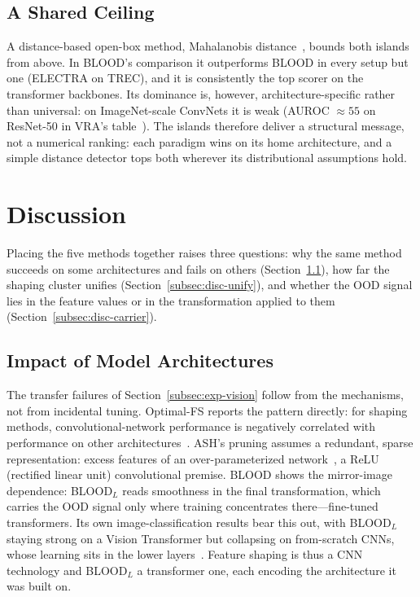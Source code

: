 \documentclass[a4paper]{article}
\begin{document}
\subsection{A Shared Ceiling}
\label{subsec:exp-ceiling}

A distance-based open-box method, Mahalanobis distance~\citep{mahalanobis}, bounds both
islands from above. In BLOOD's comparison it outperforms BLOOD in every setup but one
(ELECTRA on TREC), and it is consistently the top scorer on the transformer
backbones. Its dominance is, however, architecture-specific rather than universal: on
ImageNet-scale ConvNets it is weak (AUROC $\approx 55$ on ResNet-50 in VRA's
table~\citep{vra}). The islands therefore deliver a structural message, not a numerical ranking:
each paradigm wins on its home architecture, and a simple distance detector tops both
wherever its distributional assumptions hold.

\section{Discussion}
\label{sec:discussion}

Placing the five methods together raises three questions: why the same method succeeds
on some architectures and fails on others (Section~\ref{subsec:disc-arch}), how far the
shaping cluster unifies (Section~\ref{subsec:disc-unify}), and whether the OOD signal
lies in the feature values or in the transformation applied to them
(Section~\ref{subsec:disc-carrier}).

\subsection{Impact of Model Architectures}
\label{subsec:disc-arch}

The transfer failures of Section~\ref{subsec:exp-vision} follow from the mechanisms,
not from incidental tuning. Optimal-FS reports the pattern directly: for shaping
methods, convolutional-network performance is negatively correlated with performance on
other architectures~\citep{optimalfs}. ASH's pruning assumes a redundant, sparse
representation: excess features of an over-parameterized network~\citep{ash}, a ReLU
(rectified linear unit) convolutional premise. BLOOD shows the mirror-image dependence:
BLOOD$_L$ reads smoothness in the final transformation, which carries the OOD signal
only where training concentrates there---fine-tuned transformers. Its own
image-classification results bear this out, with BLOOD$_L$ staying strong on a Vision
Transformer but collapsing on from-scratch CNNs, whose learning sits in the lower
layers~\citep{blood}. Feature shaping is thus a CNN technology and BLOOD$_L$ a
transformer one, each encoding the architecture it was built on.
\end{document}
